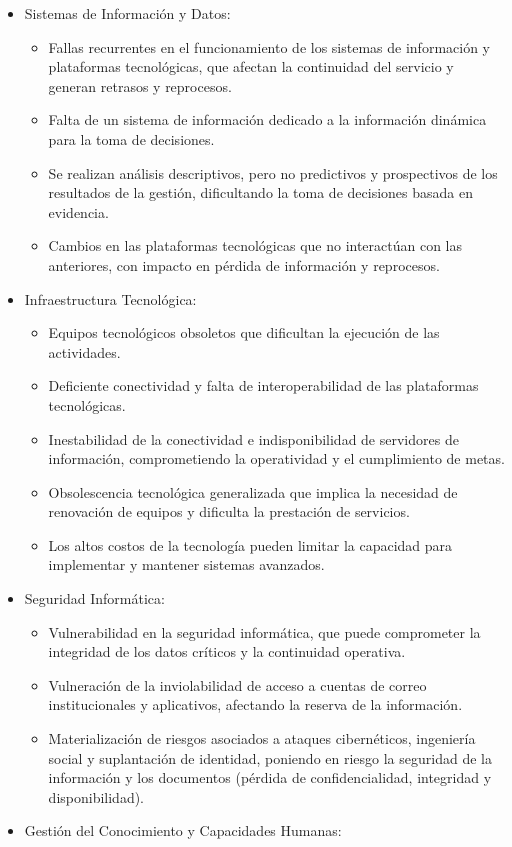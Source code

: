 \documentclass[
	a4paper, %
	12pt, %
]{include/CSSullivanBusinessReport}
\def\tightlist{}
\begin{document}
\begin{itemize}
\tightlist
\item
  Sistemas de Información y Datos:

  \begin{itemize}
  \tightlist
  \item
    Fallas recurrentes en el funcionamiento de los sistemas de
    información y plataformas tecnológicas, que afectan la continuidad
    del servicio y generan retrasos y reprocesos.
  \item
    Falta de un sistema de información dedicado a la información
    dinámica para la toma de decisiones.
  \item
    Se realizan análisis descriptivos, pero no predictivos y
    prospectivos de los resultados de la gestión, dificultando la toma
    de decisiones basada en evidencia.
  \item
    Cambios en las plataformas tecnológicas que no interactúan con las
    anteriores, con impacto en pérdida de información y reprocesos.
  \end{itemize}
\item
  Infraestructura Tecnológica:

  \begin{itemize}
  \tightlist
  \item
    Equipos tecnológicos obsoletos que dificultan la ejecución de las
    actividades.
  \item
    Deficiente conectividad y falta de interoperabilidad de las
    plataformas tecnológicas.
  \item
    Inestabilidad de la conectividad e indisponibilidad de servidores de
    información, comprometiendo la operatividad y el cumplimiento de
    metas.
  \item
    Obsolescencia tecnológica generalizada que implica la necesidad de
    renovación de equipos y dificulta la prestación de servicios.
  \item
    Los altos costos de la tecnología pueden limitar la capacidad para
    implementar y mantener sistemas avanzados.
  \end{itemize}
\item
  Seguridad Informática:

  \begin{itemize}
  \tightlist
  \item
    Vulnerabilidad en la seguridad informática, que puede comprometer la
    integridad de los datos críticos y la continuidad operativa.
  \item
    Vulneración de la inviolabilidad de acceso a cuentas de correo
    institucionales y aplicativos, afectando la reserva de la
    información.
  \item
    Materialización de riesgos asociados a ataques cibernéticos,
    ingeniería social y suplantación de identidad, poniendo en riesgo la
    seguridad de la información y los documentos (pérdida de
    confidencialidad, integridad y disponibilidad).
  \end{itemize}
\item
  Gestión del Conocimiento y Capacidades Humanas:


\end{itemize}
\end{document}
